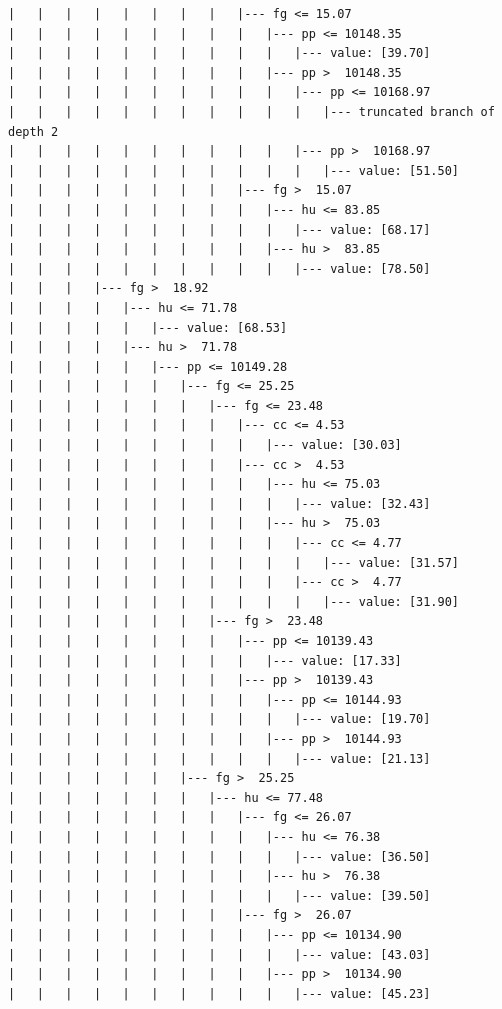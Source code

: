 \documentclass[UTF8, a4paper]{ctexart}
\begin{document}
\begin{lstlisting}
|   |   |   |   |   |   |   |   |--- fg <= 15.07
|   |   |   |   |   |   |   |   |   |--- pp <= 10148.35
|   |   |   |   |   |   |   |   |   |   |--- value: [39.70]
|   |   |   |   |   |   |   |   |   |--- pp >  10148.35
|   |   |   |   |   |   |   |   |   |   |--- pp <= 10168.97
|   |   |   |   |   |   |   |   |   |   |   |--- truncated branch of depth 2
|   |   |   |   |   |   |   |   |   |   |--- pp >  10168.97
|   |   |   |   |   |   |   |   |   |   |   |--- value: [51.50]
|   |   |   |   |   |   |   |   |--- fg >  15.07
|   |   |   |   |   |   |   |   |   |--- hu <= 83.85
|   |   |   |   |   |   |   |   |   |   |--- value: [68.17]
|   |   |   |   |   |   |   |   |   |--- hu >  83.85
|   |   |   |   |   |   |   |   |   |   |--- value: [78.50]
|   |   |   |--- fg >  18.92
|   |   |   |   |--- hu <= 71.78
|   |   |   |   |   |--- value: [68.53]
|   |   |   |   |--- hu >  71.78
|   |   |   |   |   |--- pp <= 10149.28
|   |   |   |   |   |   |--- fg <= 25.25
|   |   |   |   |   |   |   |--- fg <= 23.48
|   |   |   |   |   |   |   |   |--- cc <= 4.53
|   |   |   |   |   |   |   |   |   |--- value: [30.03]
|   |   |   |   |   |   |   |   |--- cc >  4.53
|   |   |   |   |   |   |   |   |   |--- hu <= 75.03
|   |   |   |   |   |   |   |   |   |   |--- value: [32.43]
|   |   |   |   |   |   |   |   |   |--- hu >  75.03
|   |   |   |   |   |   |   |   |   |   |--- cc <= 4.77
|   |   |   |   |   |   |   |   |   |   |   |--- value: [31.57]
|   |   |   |   |   |   |   |   |   |   |--- cc >  4.77
|   |   |   |   |   |   |   |   |   |   |   |--- value: [31.90]
|   |   |   |   |   |   |   |--- fg >  23.48
|   |   |   |   |   |   |   |   |--- pp <= 10139.43
|   |   |   |   |   |   |   |   |   |--- value: [17.33]
|   |   |   |   |   |   |   |   |--- pp >  10139.43
|   |   |   |   |   |   |   |   |   |--- pp <= 10144.93
|   |   |   |   |   |   |   |   |   |   |--- value: [19.70]
|   |   |   |   |   |   |   |   |   |--- pp >  10144.93
|   |   |   |   |   |   |   |   |   |   |--- value: [21.13]
|   |   |   |   |   |   |--- fg >  25.25
|   |   |   |   |   |   |   |--- hu <= 77.48
|   |   |   |   |   |   |   |   |--- fg <= 26.07
|   |   |   |   |   |   |   |   |   |--- hu <= 76.38
|   |   |   |   |   |   |   |   |   |   |--- value: [36.50]
|   |   |   |   |   |   |   |   |   |--- hu >  76.38
|   |   |   |   |   |   |   |   |   |   |--- value: [39.50]
|   |   |   |   |   |   |   |   |--- fg >  26.07
|   |   |   |   |   |   |   |   |   |--- pp <= 10134.90
|   |   |   |   |   |   |   |   |   |   |--- value: [43.03]
|   |   |   |   |   |   |   |   |   |--- pp >  10134.90
|   |   |   |   |   |   |   |   |   |   |--- value: [45.23]

\end{lstlisting}
\end{document}
